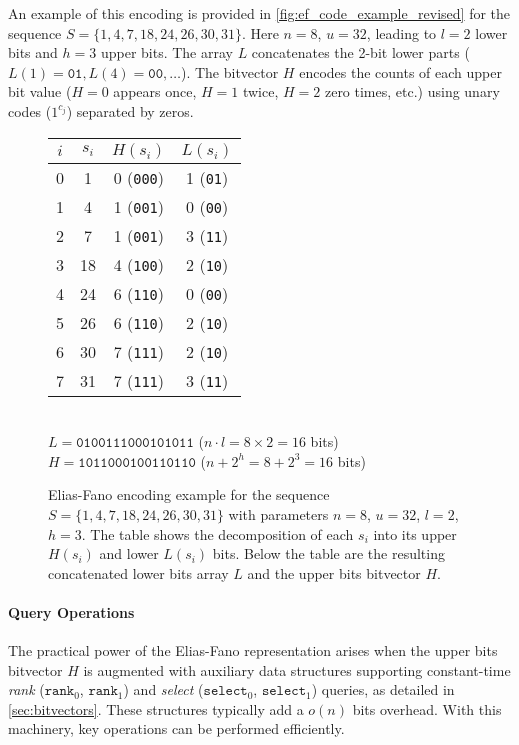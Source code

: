 An example of this encoding is provided in \autoref{fig:ef_code_example_revised} for the sequence $S = \{1, 4, 7, 18, 24, 26, 30, 31\}$. Here $n=8$, $u=32$, leading to $l=2$ lower bits and $h=3$ upper bits. The array $L$ concatenates the 2-bit lower parts ($L(1)=\texttt{01}, L(4)=\texttt{00}, \ldots$). The bitvector $H$ encodes the counts of each upper bit value ($H=0$ appears once, $H=1$ twice, $H=2$ zero times, etc.) using unary codes ($1^{c_j}$) separated by zeros.

\begin{figure}[hbtp]
    \centering
    \footnotesize
    \begin{tabular}{c | c | c c} \hline
        $i$ & $s_i$ & $H(s_i)$         & $L(s_i)$        \\ \hline
        0   & 1     & 0 (\texttt{000}) & 1 (\texttt{01}) \\
        1   & 4     & 1 (\texttt{001}) & 0 (\texttt{00}) \\
        2   & 7     & 1 (\texttt{001}) & 3 (\texttt{11}) \\
        3   & 18    & 4 (\texttt{100}) & 2 (\texttt{10}) \\
        4   & 24    & 6 (\texttt{110}) & 0 (\texttt{00}) \\
        5   & 26    & 6 (\texttt{110}) & 2 (\texttt{10}) \\
        6   & 30    & 7 (\texttt{111}) & 2 (\texttt{10}) \\
        7   & 31    & 7 (\texttt{111}) & 3 (\texttt{11}) \\ \hline
    \end{tabular} \\
    \vspace{0.5em}
    $L = \texttt{0100111000101011}$ ($n \cdot l = 8 \times 2 = 16$ bits) \\
    $H = \texttt{1011000100110110}$ ($n + 2^h = 8 + 2^3 = 16$ bits)
    \caption[Elias-Fano encoding example]{Elias-Fano encoding example for the sequence $S = \{1, 4, 7, 18, 24, 26, 30, 31\}$ with parameters $n=8$, $u=32$, $l=2$, $h=3$. The table shows the decomposition of each $s_i$ into its upper $H(s_i)$ and lower $L(s_i)$ bits. Below the table are the resulting concatenated lower bits array $L$ and the upper bits bitvector $H$.}
    \label{fig:ef_code_example_revised}
\end{figure}

\paragraph{Query Operations}
The practical power of the Elias-Fano representation arises when the upper bits bitvector $H$ is augmented with auxiliary data structures supporting constant-time \emph{rank} ($\texttt{rank}_0$, $\texttt{rank}_1$) and \emph{select} ($\texttt{select}_0$, $\texttt{select}_1$) queries, as detailed in \autoref{sec:bitvectors}. These structures typically add a $o(n)$ bits overhead. With this machinery, key operations can be performed efficiently.

